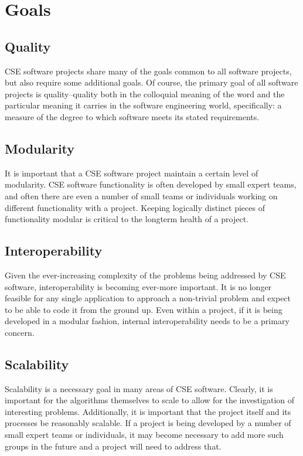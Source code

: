 \documentclass[12pt,relax]{article}
\begin{document}
\clearpage


\section{Goals}
\label{Section:Goals}

\subsection{Quality}
CSE software projects share many of the goals common to all software projects, 
but also require some additional goals.  Of course, the primary goal of all 
software projects is quality--quality both in the colloquial meaning of the 
word and the particular meaning it carries in the software engineering world, 
specifically:  a measure of the degree to which software meets its stated
requirements.

\subsection{Modularity}
It is important that a CSE software project maintain a certain level of 
modularity.  CSE software functionality is often developed by small expert 
teams, and often there are even a number of small teams or individuals working 
on different functionality with a project.  Keeping logically distinct pieces 
of functionality modular is critical to the longterm health of a project.  

\subsection{Interoperability}
Given the ever-increasing complexity of the problems being addressed by CSE 
software, interoperability is becoming ever-more important.  It is no longer 
feasible for any single application to approach a non-trivial problem and
expect to be able to code it from the ground up.  Even within a project, if it 
is being developed in a modular fashion, internal interoperability needs to be 
a primary concern.

\subsection{Scalability}
Scalability is a necessary goal in many areas of CSE software.  Clearly, it is 
important for the algorithms themselves to scale to allow for the investigation 
of interesting problems.  Additionally, it is important that the project itself 
and its processes be reasonably scalable.  If a project is being developed by a
number of small expert teams or individuals, it may become necessary to add 
more such groups in the future and a project will need to address that.
\end{document}
